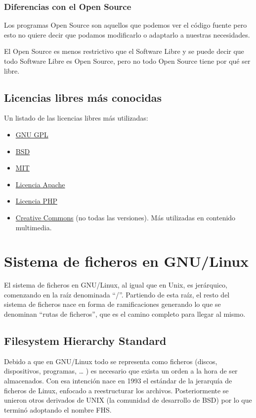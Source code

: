 \subsection{Diferencias con el Open Source}
Los programas Open Source son aquellos que podemos ver el código fuente pero esto no quiere decir que podamos modificarlo o adaptarlo a nuestras necesidades.

El Open Source es menos restrictivo que el Software Libre y se puede decir que todo Software Libre es Open Source, pero no todo Open Source tiene por qué ser libre.


\section{Licencias libres más conocidas}
Un listado de las licencias libres más utilizadas:

\begin{itemize}
    \item \href{https://es.wikipedia.org/wiki/GNU_General_Public_License}{GNU GPL}
    \item \href{https://es.wikipedia.org/wiki/Licencia_BSD}{BSD}
    \item \href{https://es.wikipedia.org/wiki/Licencia_MIT}{MIT}
    \item \href{https://es.wikipedia.org/wiki/Apache_License}{Licencia Apache}
    \item \href{https://es.wikipedia.org/wiki/Licencia_PHP}{Licencia PHP}
    \item \href{https://es.wikipedia.org/wiki/Licencias_Creative_Commons}{Creative Commons} (no todas las versiones). Más utilizadas en contenido multimedia.
\end{itemize}


\chapter{Sistema de ficheros en GNU/Linux}
El sistema de ficheros en GNU/Linux, al igual que en Unix, es jerárquico, comenzando en la raíz denominada “/”. Partiendo de esta raíz, el resto del sistema de ficheros nace en forma de ramificaciones generando lo que se denominan “rutas de ficheros”, que es el camino completo para llegar al mismo.

\section{Filesystem Hierarchy Standard}
Debido a que en GNU/Linux todo se representa como ficheros (discos, dispositivos, programas, … ) es necesario que exista un orden a la hora de ser almacenados. Con esa intención nace en 1993 el estándar de la jerarquía de ficheros de Linux, enfocado a reestructurar los archivos. Posteriormente se unieron otros derivados de UNIX (la comunidad de desarrollo de BSD) por lo que terminó adoptando el nombre FHS.

